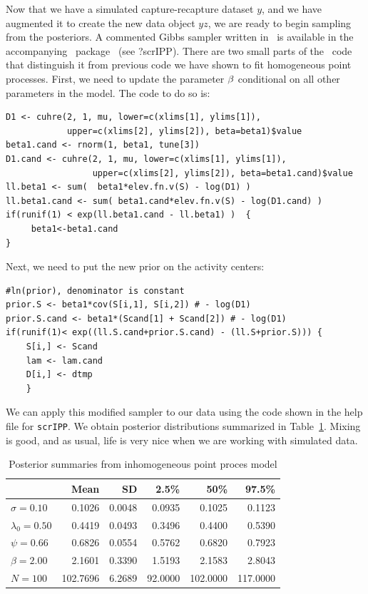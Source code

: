 Now that we have a simulated capture-recapture dataset $y$, and we have
augmented it to create the new data object $yz$, we are ready to
begin sampling from the posteriors. A commented Gibbs sampler written
in \R~is available in the accompanying \R~package \scrbook~(see
?scrIPP). There are two small parts of the
\R~code that distinguish it from previous code we have shown to
fit homogeneous point processes. First, we need to update the parameter
${\bf \beta}$ conditional on all other parameters in the model. The code to
do so is:

\begin{small}
\begin{verbatim}
D1 <- cuhre(2, 1, mu, lower=c(xlims[1], ylims[1]),
            upper=c(xlims[2], ylims[2]), beta=beta1)$value
beta1.cand <- rnorm(1, beta1, tune[3])
D1.cand <- cuhre(2, 1, mu, lower=c(xlims[1], ylims[1]),
                 upper=c(xlims[2], ylims[2]), beta=beta1.cand)$value
ll.beta1 <- sum(  beta1*elev.fn.v(S) - log(D1) )
ll.beta1.cand <- sum( beta1.cand*elev.fn.v(S) - log(D1.cand) )
if(runif(1) < exp(ll.beta1.cand - ll.beta1) )  {
     beta1<-beta1.cand
}
\end{verbatim}
\end{small}

Next, we need to put the new prior on the activity centers:

\begin{small}
\begin{verbatim}
#ln(prior), denominator is constant
prior.S <- beta1*cov(S[i,1], S[i,2]) # - log(D1)
prior.S.cand <- beta1*(Scand[1] + Scand[2]) # - log(D1)
if(runif(1)< exp((ll.S.cand+prior.S.cand) - (ll.S+prior.S))) {
    S[i,] <- Scand
    lam <- lam.cand
    D[i,] <- dtmp
    }
\end{verbatim}
\end{small}

We can apply this modified sampler to our data using the code shown in
the help file for \verb+scrIPP+. We obtain posterior
distributions summarized in Table~\ref{ch9:tab:simIPP}. Mixing is good, and as usual,
life is very nice when we are working with simulated data.

\begin{table}[b]
\centering
\caption{Posterior summaries from inhomogeneous point proces model}
\begin{tabular}{lrrrrr}
\hline
& Mean & SD & 2.5\% & 50\% & 97.5\% \\
\hline
 $\sigma =0.10$ &   0.1026 &   0.0048 &   0.0935 &   0.1025 &   0.1123 \\
 $\lambda_0=0.50$ &   0.4419 &   0.0493 &   0.3496 &   0.4400 &   0.5390 \\
 $\psi =0.66$ &   0.6826 &   0.0554 &   0.5762 &   0.6820 &   0.7923 \\
 $\beta =2.00$ &   2.1601 &   0.3390 &   1.5193 &   2.1583 &   2.8043 \\
 $N =100$ & 102.7696 &   6.2689 &  92.0000 & 102.0000 & 117.0000 \\
\hline
\end{tabular}
\label{ch9:tab:simIPP}
\end{table}


